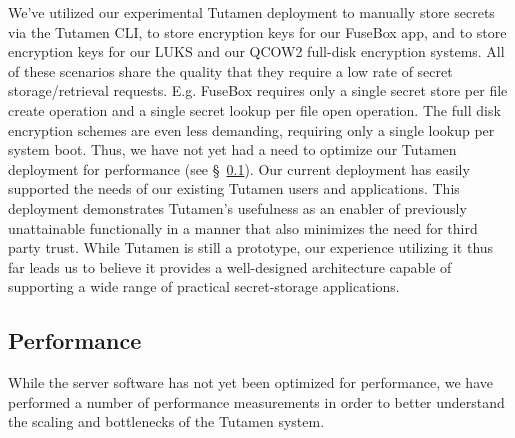 We've utilized our experimental Tutamen deployment to manually store
secrets via the Tutamen CLI, to store encryption keys for our FuseBox
app, and to store encryption keys for our LUKS and our QCOW2 full-disk
encryption systems. All of these scenarios share the quality that they
require a low rate of secret storage/retrieval requests. E.g. FuseBox
requires only a single secret store per file create operation and a
single secret lookup per file open operation. The full disk encryption
schemes are even less demanding, requiring only a single lookup per
system boot. Thus, we have not yet had a need to optimize our Tutamen
deployment for performance (see \S~\ref{sec:eval:perf}). Our current
deployment has easily supported the needs of our existing Tutamen
users and applications. This deployment demonstrates Tutamen's
usefulness as an enabler of previously unattainable functionally in a
manner that also minimizes the need for third party trust. While
Tutamen is still a prototype, our experience utilizing it thus far
leads us to believe it provides a well-designed architecture capable
of supporting a wide range of practical secret-storage applications.

\subsection{Performance}
\label{sec:eval:perf}

While the server software has not yet been optimized for performance,
we have performed a number of performance measurements in order to
better understand the scaling and bottlenecks of the Tutamen system.

